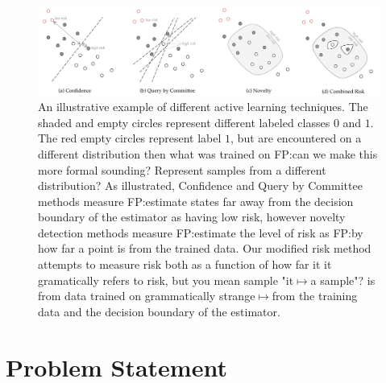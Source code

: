 \documentclass[10pt, conference]{ieeeconf}      %
\begin{document}
\begin{figure}[ht]
\centering

\includegraphics[width=\textwidth]{figures/active_learning.pdf}

\caption{An illustrative example of different active learning techniques. The shaded and empty circles represent
different labeled classes $0$ and $1$. The red empty circles represent label $1$, but are encountered on a different
distribution then what was trained on
{\color{blue} FP:can we make this more formal sounding? Represent samples from a different distribution?} 
As illustrated, Confidence and Query by Committee methods
measure
{\color{blue} FP:estimate} states far away from the decision boundary of the estimator as having low risk,
however novelty detection methods measure {\color{blue} FP:estimate} the level of risk as
{\color{blue}FP:by} how far a point is from the trained data. Our
modified risk method attempts to measure risk both as a function of how far it
{\color{blue}it gramatically refers to risk,
but you mean sample "it$\mapsto$a sample"?} is from data trained on
{\color{blue}grammatically strange$\mapsto$from the training data} and the decision boundary of the estimator. 
}
\label{fig:support_example}
\end{figure}



\section{Problem Statement}
\end{document}
